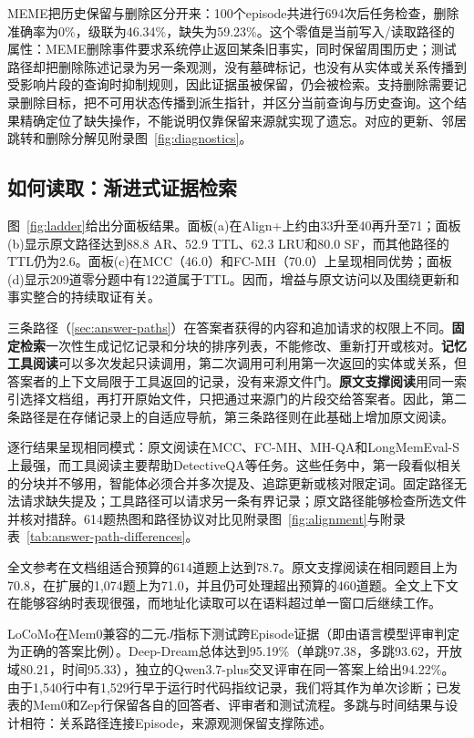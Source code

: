 MEME把历史保留与删除区分开来：100个episode共进行694次后任务检查，删除准确率为0\%，级联为46.34\%，缺失为59.23\%。这个零值是当前写入/读取路径的属性：MEME删除事件要求系统停止返回某条旧事实，同时保留周围历史；测试路径却把删除陈述记录为另一条观测，没有墓碑标记，也没有从实体或关系传播到受影响片段的查询时抑制规则，因此证据虽被保留，仍会被检索。支持删除需要记录删除目标，把不可用状态传播到派生指针，并区分当前查询与历史查询。这个结果精确定位了缺失操作，不能说明仅靠保留来源就实现了遗忘。对应的更新、邻居跳转和删除分解见附录图~\ref{fig:diagnostics}。

\subsection{如何读取：渐进式证据检索}
\label{sec:ladder}
\label{sec:relational-benchmark}

图~\ref{fig:ladder}给出分面板结果。面板(a)在Align+上约由33升至40再升至71；面板(b)显示原文路径达到88.8 AR、52.9 TTL、62.3 LRU和80.0 SF，而其他路径的TTL仍为2.6。面板(c)在MCC（46.0）和FC-MH（70.0）上呈现相同优势；面板(d)显示209道零分题中有122道属于TTL。因而，增益与原文访问以及围绕更新和事实整合的持续取证有关。

三条路径（\cref{sec:answer-paths}）在答案者获得的内容和追加请求的权限上不同。\textbf{固定检索}一次性生成记忆记录和分块的排序列表，不能修改、重新打开或核对。\textbf{记忆工具阅读}可以多次发起只读调用，第二次调用可利用第一次返回的实体或关系，但答案者的上下文局限于工具返回的记录，没有来源文件门。\textbf{原文支撑阅读}用同一索引选择文档组，再打开原始文件，只把通过来源门的片段交给答案者。因此，第二条路径是在存储记录上的自适应导航，第三条路径则在此基础上增加原文阅读。

逐行结果呈现相同模式：原文阅读在MCC、FC-MH、MH-QA和LongMemEval-S上最强，而工具阅读主要帮助DetectiveQA等任务。这些任务中，第一段看似相关的分块并不够用，智能体必须合并多次提及、追踪更新或核对限定词。固定路径无法请求缺失提及；工具路径可以请求另一条有界记录；原文路径能够检查所选文件并核对措辞。614题热图和路径协议对比见附录图~\ref{fig:alignment}与附录表~\ref{tab:answer-path-differences}。

全文参考在文档组适合预算的614道题上达到78.7。原文支撑阅读在相同题目上为70.8，在扩展的1{,}074题上为71.0，并且仍可处理超出预算的460道题。全文上下文在能够容纳时表现很强，而地址化读取可以在语料超过单一窗口后继续工作。

LoCoMo在Mem0兼容的二元$J$指标下测试跨Episode证据（即由语言模型评审判定为正确的答案比例）。Deep-Dream总体达到95.19\%（单跳97.38，多跳93.62，开放域80.21，时间95.33），独立的Qwen3.7-plus交叉评审在同一答案上给出94.22\%。由于1,540行中有1,529行早于运行时代码指纹记录，我们将其作为单次诊断；已发表的Mem0和Zep行保留各自的回答者、评审者和测试流程。多跳与时间结果与设计相符：关系路径连接Episode，来源观测保留支撑陈述。

